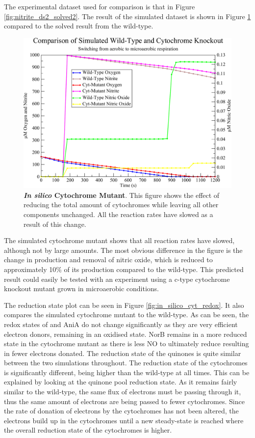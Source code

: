 The experimental dataset used for comparison is that in Figure \ref{fig:nitrite_ds2_solved2}. The result of the simulated dataset is shown in Figure \ref{fig:in_silico_cyt} compared to the solved result from the wild-type.
\begin{figure}[tbp]
 \centering
 \includegraphics[width=15cm, clip=true]{./09-completedmodel/data/in_silico_cyt.pdf}
 \caption[In Silico Cytochrome Mutant]{{\bf \textit{In silico} Cytochrome Mutant}. This figure shows the effect of reducing the total amount of cytochromes while leaving all other components unchanged. All the reaction rates have slowed as a result of this change.
 \label{fig:in_silico_cyt}}
\end{figure}

The simulated cytochrome mutant shows that all reaction rates have slowed, although not by large amounts. The most obvious difference in the figure is the change in production and removal of nitric oxide, which is reduced to approximately 10\% of its production compared to the wild-type. This predicted result could easily be tested with an experiment using a c-type cytochrome knockout mutant grown in microaerobic conditions.

The reduction state plot can be seen in Figure \ref{fig:in_silico_cyt_redox}. It also compares the simulated cytochrome mutant to the wild-type. As can be seen, the redox states of \cbbthree{} and AniA do not change significantly as they are very efficient electron donors, remaining in an oxidised state. NorB remains in a more reduced state in the cytochrome mutant as there is less NO to ultimately reduce resulting in fewer electrons donated. The reduction state of the quinones is quite similar between the two simulations throughout. The reduction state of the cytochromes is significantly different, being higher than the wild-type at all times. This can be explained by looking at the quinone pool reduction state. As it remains fairly similar to the wild-type, the same flux of electrons must be passing through it, thus the same amount of electrons are being passed to fewer cytochromes. Since the rate of donation of electrons by the cytochromes has not been altered, the electrons build up in the cytochromes 
until a new steady-state is reached where the overall reduction state of the cytochromes is higher.

